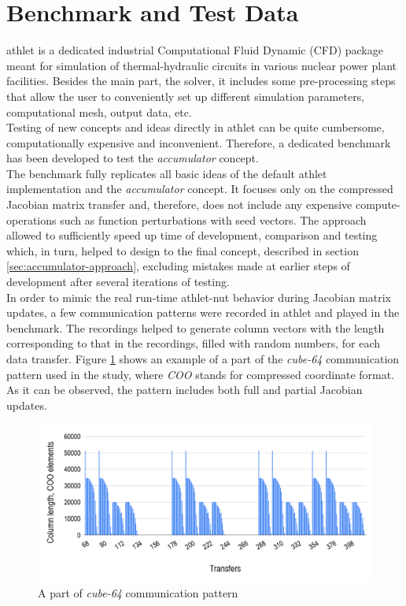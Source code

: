 \section{Benchmark and Test Data}
\label{sec:benchmark-and-test-data}


\gls{athlet} is a dedicated industrial Computational Fluid Dynamic (CFD) package meant for simulation of thermal-hydraulic circuits in various nuclear power plant facilities. Besides the main part, the solver, it includes some pre-processing steps that allow the user to conveniently set up different simulation parameters, computational mesh, output data, etc.\\


Testing of new concepts and ideas directly in \gls{athlet} can be quite cumbersome, computationally expensive and inconvenient. Therefore, a dedicated benchmark has been developed to test the \textit{accumulator} concept.\\


The benchmark fully replicates all basic ideas of the default \gls{athlet} implementation and the \textit{accumulator} concept. It  focuses only on the compressed Jacobian matrix transfer and, therefore, does not include any expensive compute-operations such as function perturbations with seed vectors. The approach allowed to sufficiently speed up time of development, comparison and testing which, in turn, helped to design to the final concept, described in section \ref{sec:accumulator-approach}, excluding mistakes made at earlier steps of development after several iterations of testing.\\


In order to mimic the real run-time \gls{athlet}-\gls{nut} behavior during Jacobian matrix updates, a few communication patterns were recorded in \gls{athlet} and played in the benchmark. The recordings helped to generate column vectors with the length corresponding to that in the recordings, filled with random numbers, for each data transfer. Figure \ref{fig:communication-pattern} shows an example of a part of the \textit{cube-64} communication pattern used in the study, where \textit{COO} stands for compressed coordinate format. As it can be observed, the pattern includes both full and partial Jacobian updates.\\


\begin{figure}[htpb]
  \centering
  \includegraphics[width=1.0\textwidth]{figures/chapter-3/communication-pattern.png}
  \caption{A part of \textit{cube-64} communication pattern} \label{fig:communication-pattern}
\end{figure}



